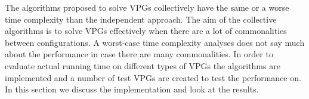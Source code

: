 The algorithms proposed to solve VPGs collectively have the same or a worse time complexity than the independent approach. The aim of the collective algorithms is to solve VPGs effectively when there are a lot of commonalities between configurations. A worst-case time complexity analyses does not say much about the performance in case there are many commonalities. In order to evaluate actual running time on different types of VPGs the algorithms are implemented and a number of test VPGs are created to test the performance on. In this section we discuss the implementation and look at the results.